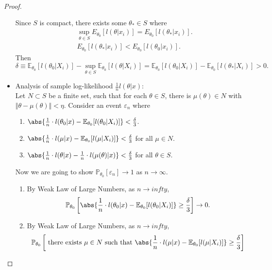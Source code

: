 \documentclass[a4paper]{article}
\begin{document}
\begin{proof}
\begin{itemize}[leftmargin=*]
		Since $S$ is compact, there exists some $\theta_* \in S$ where
		\begin{equation*}
			\begin{aligned}
				& \sup\limits_{\theta \in S} E_{\theta_0}[l(\theta|x_i)] = E_{\theta_0}[l(\theta_*|x_i)]. \\
				& E_{\theta_0}[l(\theta_*|x_i)] < E_{\theta_0}[l(\theta_0|x_i)].
			\end{aligned}
		\end{equation*}
		Then
		\begin{equation}
			\delta \equiv \mathbb{E}_{\theta_0}[l(\theta_0|X_i)] - \sup\limits_{\theta \in S}\mathbb{E}_{\theta_0}[l(\theta|X_i)] = \mathbb{E}_{\theta_0}[l(\theta_0|X_i)] - \mathbb{E}_{\theta_0}[l(\theta_*|X_i)] > 0.
		\end{equation}
		\item Analysis of sample log-likelihood $\frac{1}{n}l(\theta|x)$: \\
		Let $N \subset S$ be a finite set, such that for each $\theta \in S$, there is $\mu(\theta) \in N$ with $\Vert \theta - \mu(\theta) \Vert < \eta$. Consider an event $\varepsilon_n$ where
		\begin{enumerate}[label=(\alph*)]
			\item $\abs{\frac{1}{n} \cdot l(\theta_0|x) - \mathbb{E}_{\theta_0}[l(\theta_0|X_i)]} < \frac{\delta}{3}$.
			\item $\abs{\frac{1}{n} \cdot l(\mu|x) - \mathbb{E}_{\theta_0}[l(\mu|X_i)]} < \frac{\delta}{3}$ for all $\mu \in N$.
			\item $\abs{\frac{1}{n} \cdot l(\theta|x) - \frac{1}{n} \cdot l(\mu(\theta)|x)} < \frac{\delta}{3}$ for all $\theta \in S$.
		\end{enumerate}
		Now we are going to show $\mathbb{P}_{\theta_0}[\varepsilon_n] \to 1$ as $n \to \infty$.
		\begin{enumerate}[label=(\alph*)]
			\item By Weak Law of Large Numbers, as $n \to infty$,
			\begin{equation*}
				\mathbb{P}_{\theta_0}\left[\abs{\frac{1}{n} \cdot l(\theta_0|x) - \mathbb{E}_{\theta_0}[l(\theta_0|X_i)]} \geq \frac{\delta}{3}\right] \to 0.
			\end{equation*}
			\item By Weak Law of Large Numbers, as $n \to infty$,
			\begin{equation*}
				\begin{aligned}
					& \mathbb{P}_{\theta_0}\left[\text{ there exists } \mu \in N \text{ such that } \abs{\frac{1}{n} \cdot l(\mu|x) - \mathbb{E}_{\theta_0}[l(\mu|X_i)]} \geq \frac{\delta}{3}\right] \\

\end{aligned}
\end{equation*}
\end{enumerate}
\end{itemize}
\end{proof}
\end{document}
